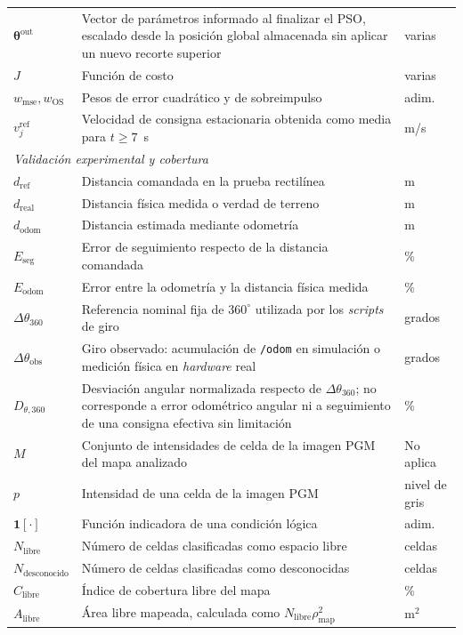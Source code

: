 \begin{appendices}
{\begin{longtable}{p{2.7cm} p{8.5cm} p{2.2cm}}
$\boldsymbol{\theta}^{\mathrm{out}}$ & Vector de parámetros informado al finalizar el PSO, escalado desde la posición global almacenada sin aplicar un nuevo recorte superior & varias \\
$J$ & Función de costo & varias \\
$w_{\mathrm{mse}},w_{\mathrm{OS}}$ & Pesos de error cuadrático y de sobreimpulso & adim. \\
$v_j^{\mathrm{ref}}$ & Velocidad de consigna estacionaria obtenida como media para $t\geq7$~s & m/s \\
\multicolumn{3}{l}{\textit{Validación experimental y cobertura}}\\
$d_{\mathrm{ref}}$ & Distancia comandada en la prueba rectilínea & m \\
$d_{\mathrm{real}}$ & Distancia física medida o verdad de terreno & m \\
$d_{\mathrm{odom}}$ & Distancia estimada mediante odometría & m \\
$E_{\mathrm{seg}}$ & Error de seguimiento respecto de la distancia
comandada & \% \\
$E_{\mathrm{odom}}$ & Error entre la odometría y la distancia física
medida & \% \\
$\Delta\theta_{360}$ & Referencia nominal fija de $360^\circ$ utilizada por los \textit{scripts} de giro & grados \\
$\Delta\theta_{\mathrm{obs}}$ & Giro observado: acumulación de \texttt{/odom} en simulación o medición física en \textit{hardware} real & grados \\
$D_{\theta,360}$ & Desviación angular normalizada respecto de $\Delta\theta_{360}$; no corresponde a error odométrico angular ni a seguimiento de una consigna efectiva sin limitación & \% \\
$M$ & Conjunto de intensidades de celda de la imagen PGM del mapa analizado & No aplica \\
$p$ & Intensidad de una celda de la imagen PGM & nivel de gris \\
$\mathbf{1}[\cdot]$ & Función indicadora de una condición lógica & adim. \\
$N_{\mathrm{libre}}$ & Número de celdas clasificadas como espacio libre & celdas \\
$N_{\mathrm{desconocido}}$ & Número de celdas clasificadas como
desconocidas & celdas \\
$C_{\mathrm{libre}}$ & Índice de cobertura libre del mapa & \% \\
$A_{\mathrm{libre}}$ & Área libre mapeada, calculada como $N_{\mathrm{libre}}\rho_{\mathrm{map}}^2$ & m$^2$ \\

\end{longtable}}
\end{appendices}
